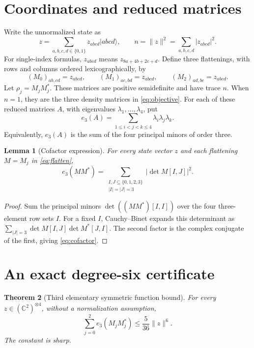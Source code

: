 \documentclass[11pt]{article}
\newtheorem{theorem}{Theorem}[section]
\newtheorem{lemma}[theorem]{Lemma}
\theoremstyle{definition}
\theoremstyle{remark}
\newcommand{\C}{\mathbb C}
\newcommand{\ket}[1]{\lvert #1\rangle}
\begin{document}
\section{Coordinates and reduced matrices}

Write the unnormalized state as
\[
 z=\sum_{a,b,c,d\in\{0,1\}}z_{abcd}\ket{abcd},
 \qquad
 n=\|z\|^2=\sum_{a,b,c,d}|z_{abcd}|^2.
\]
For single-index formulas, $z_{abcd}$ means $z_{8a+4b+2c+d}$.
Define three flattenings, with rows and columns ordered lexicographically,
by
\begin{equation}
 (M_0)_{ab,cd}=z_{abcd},\qquad
 (M_1)_{ac,bd}=z_{abcd},\qquad
 (M_2)_{ad,bc}=z_{abcd}.
 \label{eq:flatten}
\end{equation}
Let $\rho_j=M_jM_j^*$. These matrices are positive semidefinite and have
trace $n$. When $n=1$, they are the three density matrices in
\eqref{eq:objective}. For each of these reduced matrices $A$, with
eigenvalues $\lambda_1,\ldots,\lambda_4$, put
\[
 e_3(A)=\sum_{1\leq i<j<k\leq4}\lambda_i\lambda_j\lambda_k.
\]
Equivalently, $e_3(A)$ is the sum of the four principal minors of order
three.

\begin{lemma}[Cofactor expression]
\label{lem:cofactor}
For every state vector $z$ and each flattening $M=M_j$ in
\eqref{eq:flatten},
\begin{equation}
 e_3(MM^*)=\sum_{\substack{I,J\subseteq\{0,1,2,3\}\\|I|=|J|=3}}
       |\det M[I,J]|^2.
 \label{eq:cofactor}
\end{equation}
\end{lemma}
\begin{proof}
Sum the principal minors $\det((MM^*)[I,I])$ over the four three-element
row sets $I$. For a fixed $I$, Cauchy--Binet expands this determinant as
$\sum_{|J|=3}\det M[I,J]\det M^*[J,I]$. The second factor is the
complex conjugate of the first, giving \eqref{eq:cofactor}.
\end{proof}

\section{An exact degree-six certificate}
\label{sec:sos}

\begin{theorem}[Third elementary symmetric function bound]
\label{thm:e3}
For every $z\in(\C^2)^{\otimes4}$, without a normalization assumption,
\begin{equation}
 \sum_{j=0}^2 e_3(M_jM_j^*)\leq\frac5{36}\|z\|^6.
 \label{eq:e3}
\end{equation}
The constant is sharp.
\end{theorem}
\end{document}
